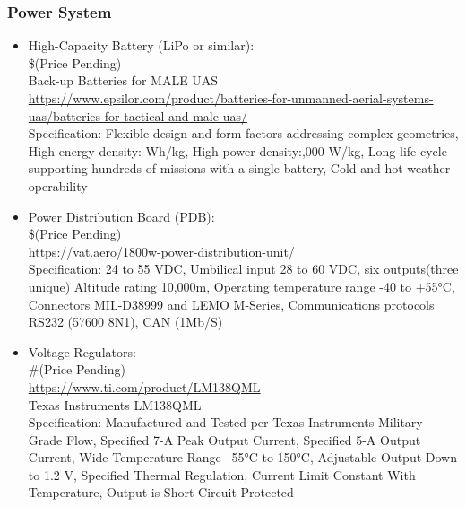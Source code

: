\subsubsection{Power System}
\begin{itemize}
    \item High-Capacity Battery (LiPo or similar): \\ \$(Price Pending) \\
    Back-up Batteries for MALE UAS \\
\href{https://www.epsilor.com/product/batteries-for-unmanned-aerial-systems-uas/batteries-for-tactical-and-male-uas/  }{https://www.epsilor.com/product/batteries-for-unmanned-aerial-systems-uas/batteries-for-tactical-and-male-uas/  }
\\    Specification: Flexible design and form factors addressing complex geometries, High energy density: Wh/kg, High power density:,000 W/kg, Long life cycle – supporting hundreds of missions with a single battery, Cold and hot weather operability
    \item Power Distribution Board (PDB):\\
    \$(Price Pending)
    \\ \href{https://vat.aero/1800w-power-distribution-unit/}{https://vat.aero/1800w-power-distribution-unit/}
    \\Specification: 24 to 55 VDC, Umbilical input	28 to 60 VDC, six outputs(three unique)
Altitude rating	10,000m, Operating temperature range -40 to +55°C, Connectors	MIL-D38999 and LEMO M-Series, Communications protocols RS232 (57600 8N1), CAN (1Mb/S)
    \item Voltage Regulators:
    \\ \#(Price Pending)
    \\\href{https://www.ti.com/product/LM138QML}{https://www.ti.com/product/LM138QML}
    \\Texas Instruments LM138QML
    \\Specification: Manufactured and Tested per Texas Instruments
Military Grade Flow, Specified 7-A Peak Output Current, Specified 5-A Output Current, Wide Temperature Range –55°C to 150°C, Adjustable Output Down to 1.2 V, Specified Thermal Regulation, Current Limit Constant With Temperature, Output is Short-Circuit Protected

\end{itemize}

